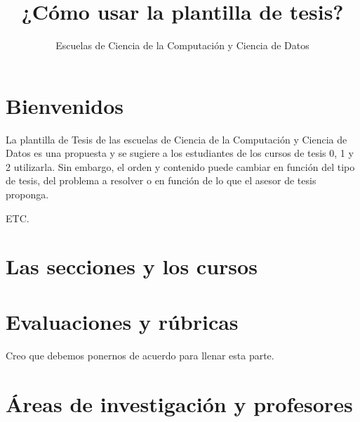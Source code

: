 \documentclass[12pt]{extarticle}
\author{\Large Escuelas de Ciencia de la Computación y Ciencia de Datos}
\title{\Huge ¿Cómo usar la plantilla de tesis?}
\begin{document}
\maketitle

\newpage

\section{Bienvenidos}

La plantilla de Tesis de las escuelas de Ciencia de la Computación y Ciencia de Datos es una propuesta y se sugiere a los estudiantes de los cursos de tesis 0, 1 y 2 utilizarla. Sin embargo, el orden y contenido puede cambiar en función del tipo de tesis, del problema a resolver o en función de lo que el asesor de tesis proponga. 

ETC.


\newpage

\section{Las secciones y los cursos}


\newpage

\section{Evaluaciones y rúbricas}

Creo que debemos ponernos de acuerdo para llenar esta parte.

\newpage

\section{Áreas de investigación y profesores}
\end{document}
